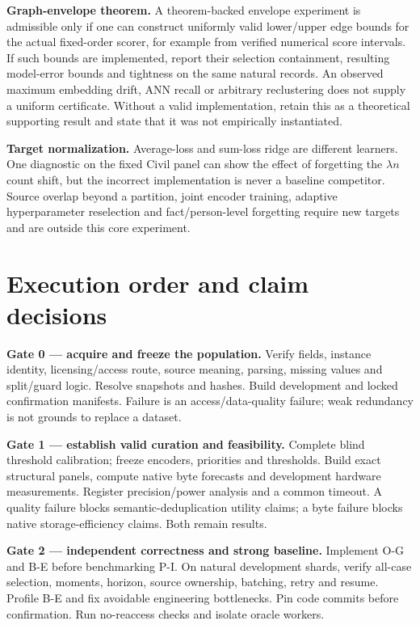 \documentclass[11pt,a4paper]{article}
\begin{document}
\textbf{Graph-envelope theorem.} A theorem-backed envelope experiment is admissible only if one can construct uniformly valid lower/upper edge bounds for the actual fixed-order scorer, for example from verified numerical score intervals. If such bounds are implemented, report their selection containment, resulting model-error bounds and tightness on the same natural records. An observed maximum embedding drift, ANN recall or arbitrary reclustering does not supply a uniform certificate. Without a valid implementation, retain this as a theoretical supporting result and state that it was not empirically instantiated.

\textbf{Target normalization.} Average-loss and sum-loss ridge are different learners. One diagnostic on the fixed Civil panel can show the effect of forgetting the $\lambda n$ count shift, but the incorrect implementation is never a baseline competitor. Source overlap beyond a partition, joint encoder training, adaptive hyperparameter reselection and fact/person-level forgetting require new targets and are outside this core experiment.

\section{Execution order and claim decisions}
\textbf{Gate 0 --- acquire and freeze the population.} Verify fields, instance identity, licensing/access route, source meaning, parsing, missing values and split/guard logic. Resolve snapshots and hashes. Build development and locked confirmation manifests. Failure is an access/data-quality failure; weak redundancy is not grounds to replace a dataset.

\textbf{Gate 1 --- establish valid curation and feasibility.} Complete blind threshold calibration; freeze encoders, priorities and thresholds. Build exact structural panels, compute native byte forecasts and development hardware measurements. Register precision/power analysis and a common timeout. A quality failure blocks semantic-deduplication utility claims; a byte failure blocks native storage-efficiency claims. Both remain results.

\textbf{Gate 2 --- independent correctness and strong baseline.} Implement O-G and B-E before benchmarking P-I. On natural development shards, verify all-case selection, moments, horizon, source ownership, batching, retry and resume. Profile B-E and fix avoidable engineering bottlenecks. Pin code commits before confirmation. Run no-reaccess checks and isolate oracle workers.
\end{document}
